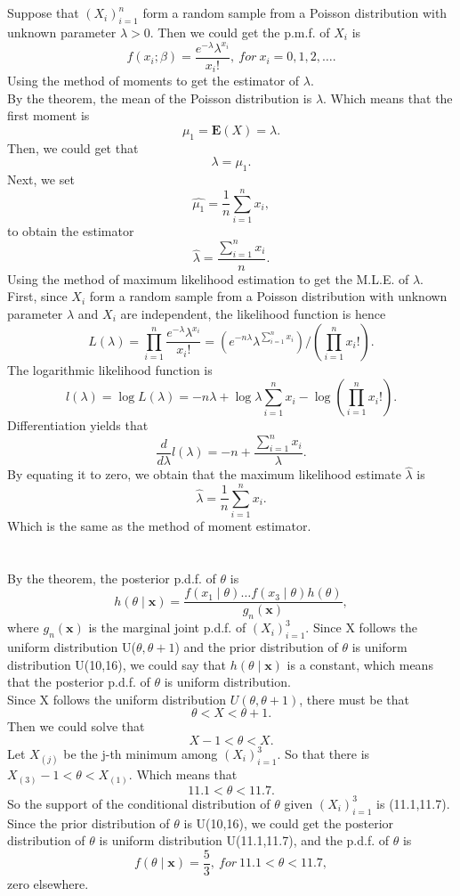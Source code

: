 \documentclass[10.5pt]{article}
\begin{document}
\section{}
Suppose that $(X_i)_{i=1}^n$ form a random sample from a Poisson distribution with unknown parameter $\lambda>0$. Then we could get the p.m.f. of $X_i$ is $$f(x_i;\beta)=\frac{e^{-\lambda}\lambda^{x_i}}{x_i!},~for ~x_i=0,1,2,\dots.$$\indent
Using the method of moments to get the estimator of $\lambda$.\\\indent 
By the theorem, the mean of the Poisson distribution is $\lambda$. Which means that the first moment is $$\mu_1=\mathbf{E}(X)=\lambda.$$\indent
Then, we could get that $$\lambda=\mu_1.$$\indent
Next, we set $$\hat{\mu_1}=\frac{1}{n}\sum_{i=1}^nx_i,$$\indent
to obtain the estimator $$\hat{\lambda}=\frac{\sum_{i=1}^nx_i}{n}.$$\indent
Using the method of maximum likelihood estimation to get the M.L.E. of $\lambda$.\\\indent
First, since $X_i$ form a random sample from a Poisson distribution with unknown parameter $\lambda$ and $X_i$ are independent, the likelihood function is hence $$L(\lambda)=\prod_{i=1}^n\frac{e^{-\lambda}\lambda^{x_i}}{x_i!}=(e^{-n\lambda}\lambda^{\sum_{i=1}^nx_i})/(\prod_{i=1}^nx_i!).$$\indent
The logarithmic likelihood function is $$l(\lambda)=\log L(\lambda)=-n\lambda+\log\lambda\sum_{i=1}^nx_i-\log(\prod_{i=1}^nx_i!).$$\indent
Differentiation yields that $$\frac{d}{d\lambda}l(\lambda)=-n+\frac{\sum_{i=1}^nx_i}{\lambda}.$$\indent
By equating it to zero, we obtain that the maximum likelihood estimate $\hat{\lambda}$ is $$\hat{\lambda}=\frac{1}{n}\sum_{i=1}^nx_i.$$\indent
Which is the same as the method of moment estimator.

\section{}
By the theorem, the posterior p.d.f. of $\theta$ is $$h(\theta\mid\mathbf{x})=\frac{f(x_1\mid\theta)\dots f(x_3\mid\theta)h(\theta)}{g_n(\mathbf{x})},$$\indent
where $g_n(\mathbf{x})$ is the marginal joint p.d.f. of $(X_i)_{i=1}^3$. Since X follows the uniform distribution U($\theta,\theta+1$) and the prior distribution of $\theta$ is uniform distribution U(10,16), we could say that $h(\theta\mid\mathbf{x})$ is a constant, which means that the posterior p.d.f. of $\theta$ is uniform distribution.\\\indent
Since X follows the uniform distribution $U(\theta,\theta+1)$, there must be that $$\theta<X<\theta+1.$$\indent
Then we could solve that $$X-1<\theta<X.$$\indent
Let $X_{(j)}$ be the j-th minimum among $(X_i)_{i=1}^3$. So that there is $X_{(3)}-1<\theta<X_{(1)}$. Which means that $$11.1<\theta<11.7.$$\indent
So the support of the conditional distribution of $\theta$ given $(X_i)_{i=1}^3$ is (11.1,11.7).\\\indent
Since the prior distribution of $\theta$ is U(10,16), we could get the posterior distribution of $\theta$ is uniform distribution U(11.1,11.7), and the p.d.f. of $\theta$ is $$f(\theta\mid\mathbf{x})=\frac{5}{3},~for ~11.1<\theta<11.7,$$\indent
zero elsewhere.
\end{document}
